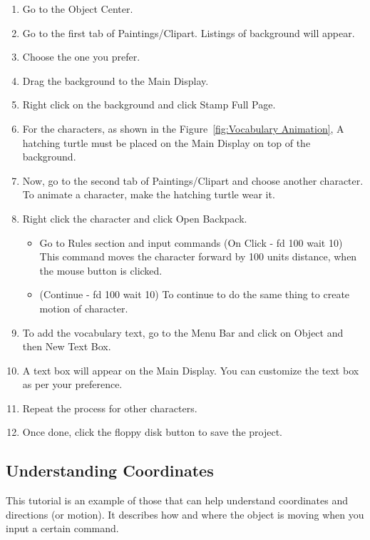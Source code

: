 \begin{enumerate}


\item Go to the Object Center.
\item Go to the first tab of Paintings/Clipart.
\subitem Listings of background will appear.
\item Choose the one you prefer.

\item Drag the background to the Main Display.
\item Right click on the background and click Stamp Full Page.
\item For the characters, as shown in the Figure~\ref{fig:Vocabulary Animation}, 
\subitem A hatching turtle must be placed on the Main Display on top of the background.
\item Now, go to the second tab of Paintings/Clipart and choose another character.
\subitem To animate a character, make the hatching turtle wear it.
\item Right click the character and click Open Backpack.
\begin{itemize}
	\item Go to Rules section and input commands (On Click - fd 100 wait 10) 
\subitem This command moves the character forward by 100 units distance, when the mouse button is clicked.
\item (Continue - fd 100 wait 10)
\subitem To continue to do the same thing to create motion of character.
\end{itemize}
\item To add the vocabulary text, go to the Menu Bar and click on Object and then New Text Box.
\item A text box will appear on the Main Display. You can customize the text box as per your preference.
\item Repeat the process for other characters.
\item Once done, click the floppy disk button to save the project.


\end{enumerate}


\subsection{Understanding Coordinates}

This tutorial is an example of those that can help understand coordinates and directions (or motion). It describes how and where the object is moving when you input a certain command.

